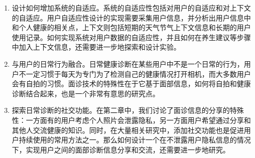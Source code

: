 \begin{enumerate}
	\item 设计如何增加系统的自适应。系统的自适应性包括对用户的自适应和对上下文的自适应。用户自适应性设计的实现需要采集用户信息，并分析出用户信息中和个人健康的相关点，上下文则包括短期的天气节气上下文信息和长期的用户使用记录。如何实现系统对用户数据的自适应性，并且如何在养生建议等步骤中加入上下文信息，还需要进一步地探索和设计实验。

	\item 与用户的日常行为融合。日常健康诊断在某些用户中不是一个日常的行为，用户不一定习惯于每天为专门为了检测自己的健康情况打开相机，而大多数用户会有自拍的习惯。面诊技术的特殊性在于它基于面部信息，如何将自拍和健康诊断结合起来，也是一个非常有意思的研究点。

	\item 探索日常诊断的社交功能。在第二章中，我们讨论了面诊信息的分享的特殊性：一方面有的用户考虑个人照片会泄露隐私，另一方面用户希望通过分享和其他人交流健康的知识。同时，在大量相关研究中，添加社交功能也是促进用户持续使用的常用方法之一。那么如何设计一个在不泄露用户隐私信息的情况下，实现用户之间的面部诊断信息分享和交流，还需要进一步地研究。
\end{enumerate}


